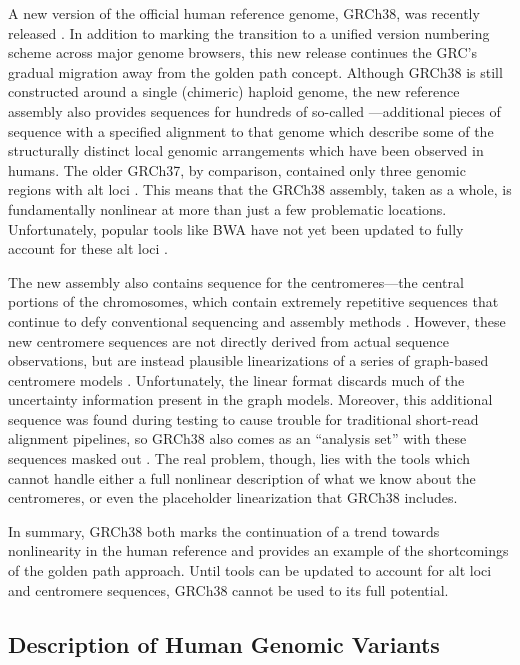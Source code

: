 A new version of the official human reference genome, GRCh38, was recently released \cite{karolchik2014new}. In addition to marking the transition to a unified version numbering scheme across major genome browsers, this new release continues the GRC's gradual migration away from the golden path concept. Although GRCh38 is still constructed around a single (chimeric) haploid genome, the new reference assembly also provides sequences for hundreds of so-called ---additional pieces of sequence with a specified alignment to that genome which describe some of the structurally distinct local genomic arrangements which have been observed in humans. The older GRCh37, by comparison, contained only three genomic regions with alt loci \cite{church2011modernizing}. This means that the GRCh38 assembly, taken as a whole, is fundamentally nonlinear at more than just a few problematic locations. Unfortunately, popular tools like BWA have not yet been updated to fully account for these alt loci \cite{li2014bwa}.

The new assembly also contains sequence for the centromeres---the central portions of the chromosomes, which contain extremely repetitive sequences that continue to defy conventional sequencing and assembly methods \cite{karolchik2014new}. However, these new centromere sequences are not directly derived from actual sequence observations, but are instead plausible linearizations of a series of graph-based centromere models \cite{miga2014centromere}. Unfortunately, the linear format discards much of the uncertainty information present in the graph models. Moreover, this additional sequence was found during testing to cause trouble for traditional short-read alignment pipelines, so GRCh38 also comes as an ``analysis set'' with these sequences masked out \cite{karolchik2014new}. The real problem, though, lies with the tools which cannot handle either a full nonlinear description of what we know about the centromeres, or even the placeholder linearization that GRCh38 includes.

In summary, GRCh38 both marks the continuation of a trend towards nonlinearity in the human reference and provides an example of the shortcomings of the golden path approach. Until tools can be updated to account for alt loci and centromere sequences, GRCh38 cannot be used to its full potential.
    
\subsection{Description of Human Genomic Variants}

